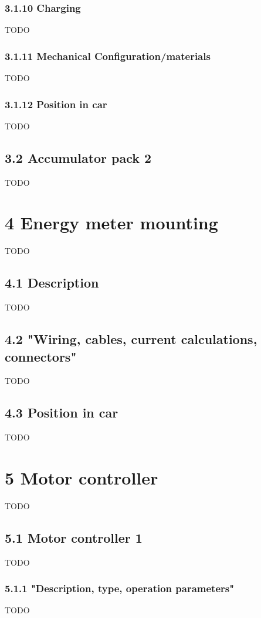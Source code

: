 \documentclass{article}
\begin{document}
\subsubsection*{3.1.10 Charging}
TODO

\subsubsection*{3.1.11 Mechanical Configuration/materials}
TODO

\subsubsection*{3.1.12 Position in car}
TODO

\subsection*{3.2 Accumulator pack 2}
TODO

\section*{4 Energy meter mounting}
TODO

\subsection*{4.1 Description}
TODO

\subsection*{4.2 "Wiring, cables, current calculations, connectors"}
TODO

\subsection*{4.3 Position in car}
TODO

\section*{5 Motor controller}
TODO

\subsection*{5.1 Motor controller 1}
TODO

\subsubsection*{5.1.1 "Description, type, operation parameters"}
TODO
\end{document}
